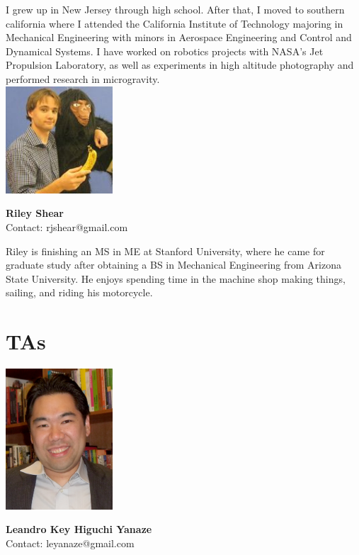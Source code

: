 I grew up in New Jersey through high school. After that, I moved to southern california where I attended the California Institute of Technology majoring in Mechanical Engineering with minors in Aerospace Engineering and Control and Dynamical Systems. I have worked on robotics projects with NASA’s Jet Propulsion Laboratory, as well as experiments in high altitude photography and performed research in microgravity.
\\

\noindent \includegraphics[width=40mm]{images/riley.jpg}
\parbox[b]{0.6\textwidth}{\textbf{Riley Shear}\\ 
Contact: rjshear@gmail.com\\
}

Riley is finishing an MS in ME at Stanford University, where he came for graduate study after obtaining a BS in Mechanical Engineering from Arizona State University. He enjoys spending time in the machine shop making things, sailing, and riding his motorcycle.

\section{TAs}
\noindent \includegraphics[width=40mm]{images/foto_leandro.jpg}
\parbox[b]{0.6\textwidth}{\textbf{Leandro Key Higuchi Yanaze}\\ 
Contact: leyanaze@gmail.com \\
}

